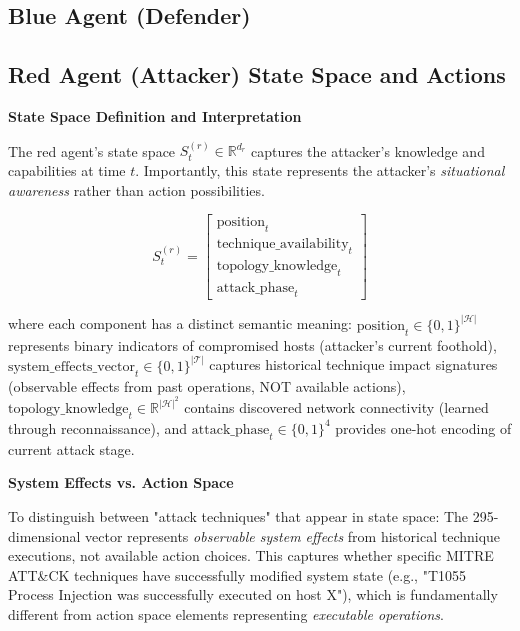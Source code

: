 \documentclass[12pt,oneside]{article}
\begin{document}
\subsection{Blue Agent (Defender)}

\subsection{Red Agent (Attacker) State Space and Actions}

\textbf{State Space Definition and Interpretation}

The red agent's state space $S^{(r)}_t \in \mathbb{R}^{d_r}$ captures the attacker's knowledge and capabilities at time $t$. Importantly, this state represents the attacker's \textit{situational awareness} rather than action possibilities.

\begin{equation}
S^{(r)}_t = \begin{bmatrix}
\text{position}_t \\
\text{technique\_availability}_t \\
\text{topology\_knowledge}_t \\
\text{attack\_phase}_t
\end{bmatrix}
\end{equation}

where each component has a distinct semantic meaning: $\text{position}_t \in \{0,1\}^{|\mathcal{H}|}$ represents binary indicators of compromised hosts (attacker's current foothold), $\text{system\_effects\_vector}_t \in \{0,1\}^{|\mathcal{T}|}$ captures historical technique impact signatures (observable effects from past operations, NOT available actions), $\text{topology\_knowledge}_t \in \mathbb{R}^{|\mathcal{H}|^2}$ contains discovered network connectivity (learned through reconnaissance), and $\text{attack\_phase}_t \in \{0,1\}^4$ provides one-hot encoding of current attack stage.

\textbf{System Effects vs. Action Space}

To distinguish between "attack techniques" that appear in state space: The 295-dimensional vector represents \textit{observable system effects} from historical technique executions, not available action choices. This captures whether specific MITRE ATT\&CK techniques have successfully modified system state (e.g., "T1055 Process Injection was successfully executed on host X"), which is fundamentally different from action space elements representing \textit{executable operations}.
\end{document}
